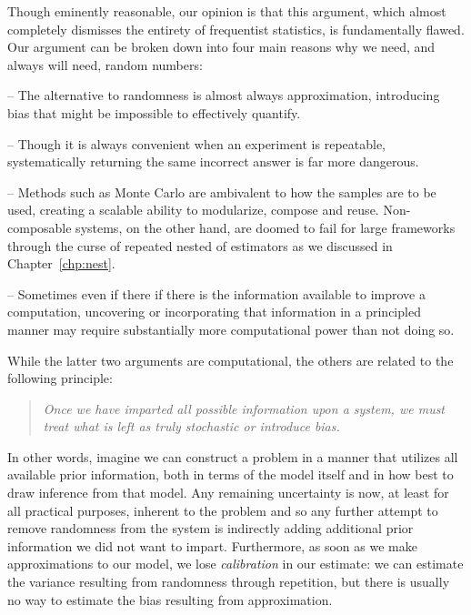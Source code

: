 Though eminently reasonable, our opinion is that this argument, which almost completely dismisses the entirety
of frequentist statistics, is fundamentally flawed.  Our argument can be broken down into four main reasons 
why we need, and always will need, random numbers:
\begin{description}[align=left]
	\vspace{-8pt}
	\setlength\itemsep{-0.1em}
	\item[Honesty and reliability] -- The alternative to randomness is almost always approximation, introducing bias 
	that might be impossible to effectively quantify.
	\item[Lack of repeatability] -- Though it is always convenient when an experiment is repeatable, systematically 
	returning the same incorrect answer is far more dangerous.
	\item[Composability] -- Methods such as Monte Carlo are ambivalent to how the samples are to be used, creating 
	a scalable ability to modularize, compose and reuse.  Non-composable systems, on the other hand, are doomed to fail
	for large frameworks through the curse of repeated nested of estimators as we discussed in Chapter~\ref{chp:nest}.
	\item[Speed and simplicity] -- Sometimes even if there if there is the information available to improve a computation, 
	uncovering or incorporating that information in a principled manner may require substantially more computational 
	power than not doing so.
	\vspace{-10pt}
\end{description}
While the latter two arguments are computational, the others are related to the following principle:
\begin{quote}
	\vspace{-4pt}
	\emph{Once we have imparted all possible information upon a system, we must treat what is left as truly 
		stochastic or introduce bias.}
	\vspace{-8pt}
\end{quote}
In other words, imagine we can construct a problem in a manner that utilizes all available prior information,
both in terms of the model itself and in how best to draw inference from that model.
Any remaining uncertainty is now, at least for all practical purposes, inherent to the problem and so any
further attempt to remove randomness from the system is indirectly adding additional prior information we
did not want to impart.  Furthermore, as soon as we make approximations to our model,
we lose \emph{calibration} in our estimate: we can estimate the variance
resulting from randomness through repetition, but there is usually no way to estimate the bias
resulting from approximation.

